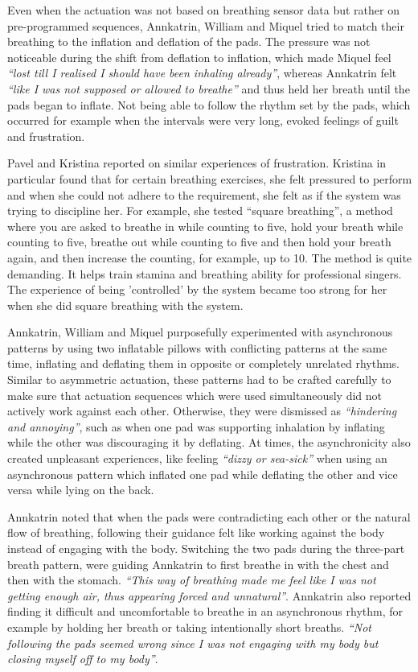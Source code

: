 Even when the actuation was not based on breathing sensor data but rather on pre-programmed sequences, Annkatrin, William and Miquel tried to match their breathing to the inflation and deflation of the pads. The pressure was not noticeable during the shift from deflation to inflation, which made Miquel feel \textit{``lost till I realised I should have been inhaling already''}, whereas Annkatrin felt \textit{``like I was not supposed or allowed to breathe''} and thus held her breath until the pads began to inflate. Not being able to follow the rhythm set by the pads, which occurred for example when the intervals were very long, evoked feelings of guilt and frustration.

Pavel and Kristina reported on similar experiences of frustration. Kristina in particular found that for certain breathing exercises, she felt pressured to perform and when she could not adhere to the requirement, she felt as if the system was trying to discipline her. For example, she tested ``square breathing'', a method where you are asked to breathe in while counting to five, hold your breath while counting to five, breathe out while counting to five and then hold your breath again, and then increase the counting, for example, up to 10. The method is quite demanding. It helps train stamina and breathing ability for professional singers. The experience of being 'controlled' by the system became too strong for her when she did square breathing with the system.

Annkatrin, William and Miquel purposefully experimented with asynchronous patterns by using two inflatable pillows with conflicting patterns at the same time, inflating and deflating them in opposite or completely unrelated rhythms. Similar to asymmetric actuation, these patterns had to be crafted carefully to make sure that actuation sequences which were used simultaneously did not actively work against each other. Otherwise, they were dismissed as \textit{``hindering and annoying''}, such as when one pad was supporting inhalation by inflating while the other was discouraging it by deflating. At times, the asynchronicity also created unpleasant experiences, like feeling \textit{``dizzy or sea-sick''} when using an asynchronous pattern which inflated one pad while deflating the other and vice versa while lying on the back.

Annkatrin noted that when the pads were contradicting each other or the natural flow of breathing, following their guidance felt like working against the body instead of engaging with the body. Switching the two pads during the three-part breath pattern, were guiding Annkatrin to first breathe in with the chest and then with the stomach. \textit{``This way of breathing made me feel like I was not getting enough air, thus appearing forced and unnatural''}. Annkatrin also reported finding it difficult and uncomfortable to breathe in an asynchronous rhythm, for example by holding her breath or taking intentionally short breaths. \textit{``Not following the pads seemed wrong since I was not engaging with my body but closing myself off to my body''}.

